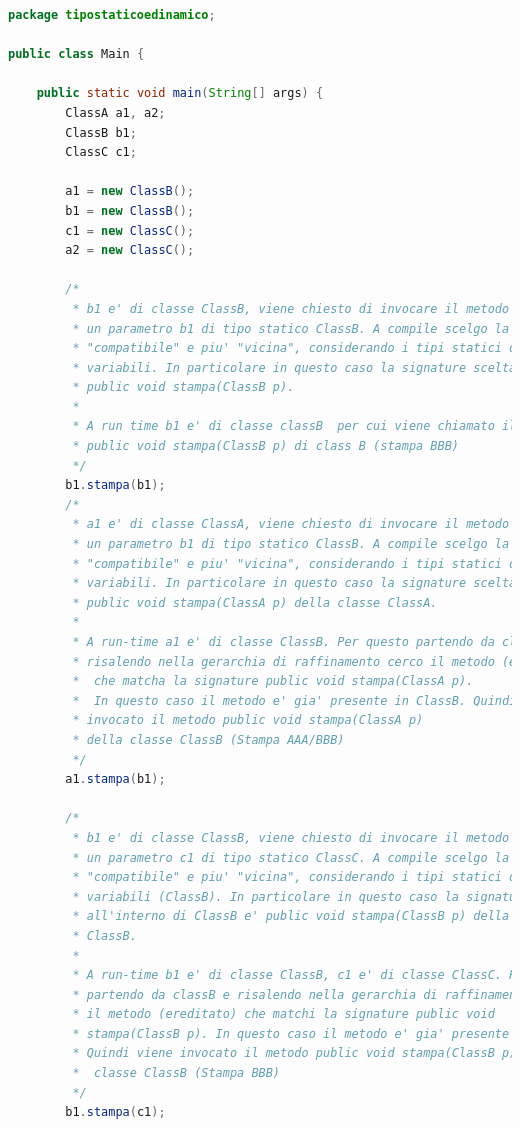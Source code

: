 \documentclass{article}
\begin{document}
\begin{lstlisting}[language=Java,escapechar=|]
package tipostaticoedinamico;

public class Main {

	public static void main(String[] args) {
		ClassA a1, a2;
		ClassB b1;
		ClassC c1;

		a1 = new ClassB();
		b1 = new ClassB();
		c1 = new ClassC();
		a2 = new ClassC();

		/*
		 * b1 e' di classe ClassB, viene chiesto di invocare il metodo stampa su
		 * un parametro b1 di tipo statico ClassB. A compile scelgo la signature
		 * "compatibile" e piu' "vicina", considerando i tipi statici delle
		 * variabili. In particolare in questo caso la signature scelta e'
		 * public void stampa(ClassB p).
		 * 
		 * A run time b1 e' di classe classB  per cui viene chiamato il metodo
		 * public void stampa(ClassB p) di class B (stampa BBB)
		 */
		b1.stampa(b1);
		/*
		 * a1 e' di classe ClassA, viene chiesto di invocare il metodo stampa su
		 * un parametro b1 di tipo statico ClassB. A compile scelgo la signature
		 * "compatibile" e piu' "vicina", considerando i tipi statici delle
		 * variabili. In particolare in questo caso la signature scelta e'
		 * public void stampa(ClassA p) della classe ClassA.
		 * 
		 * A run-time a1 e' di classe ClassB. Per questo partendo da classB e
		 * risalendo nella gerarchia di raffinamento cerco il metodo (ereditato)
		 *  che matcha la signature public void stampa(ClassA p).
		 *  In questo caso il metodo e' gia' presente in ClassB. Quindi viene 
		 * invocato il metodo public void stampa(ClassA p) 
		 * della classe ClassB (Stampa AAA/BBB)
		 */
		a1.stampa(b1);

		/*
		 * b1 e' di classe ClassB, viene chiesto di invocare il metodo stampa su
		 * un parametro c1 di tipo statico ClassC. A compile scelgo la signature
		 * "compatibile" e piu' "vicina", considerando i tipi statici delle
		 * variabili (ClassB). In particolare in questo caso la signature scelta
		 * all'interno di ClassB e' public void stampa(ClassB p) della classe
		 * ClassB.
		 * 
		 * A run-time b1 e' di classe ClassB, c1 e' di classe ClassC. Per questo
		 * partendo da classB e risalendo nella gerarchia di raffinamento cerco
		 * il metodo (ereditato) che matchi la signature public void 
		 * stampa(ClassB p). In questo caso il metodo e' gia' presente in ClassB.
		 * Quindi viene invocato il metodo public void stampa(ClassB p) della
		 *  classe ClassB (Stampa BBB)
		 */
		b1.stampa(c1);


\end{lstlisting}
\end{document}
